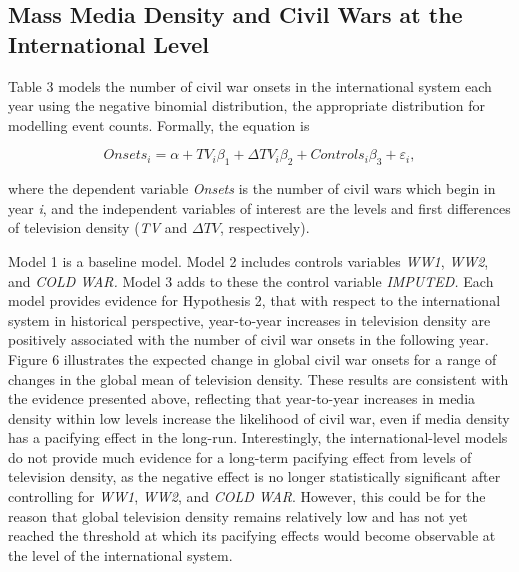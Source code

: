 \documentclass[11pt,article,oneside]{memoir}
\begin{document}
\subsection{Mass Media Density and Civil Wars at the International
Level}\label{mass-media-density-and-civil-wars-at-the-international-level}

Table 3 models the number of civil war onsets in the international
system each year using the negative binomial distribution, the
appropriate distribution for modelling event counts. Formally, the
equation is

\[ Onsets_{i} = \alpha + TV_{i} \beta_1 + \Delta TV_{i} \beta_2 + Controls_{i} \beta_3  + \varepsilon_{i}, \]

where the dependent variable \emph{Onsets} is the number of civil wars
which begin in year \emph{i}, and the independent variables of interest
are the levels and first differences of television density (\emph{TV}
and $\Delta TV$, respectively).

Model 1 is a baseline model. Model 2 includes controls variables
\emph{WW1}, \emph{WW2}, and \emph{COLD WAR.} Model 3 adds to these the
control variable \emph{IMPUTED.} Each model provides evidence for
Hypothesis 2, that with respect to the international system in
historical perspective, year-to-year increases in television density are
positively associated with the number of civil war onsets in the
following year. Figure 6 illustrates the expected change in global civil
war onsets for a range of changes in the global mean of television
density. These results are consistent with the evidence presented above,
reflecting that year-to-year increases in media density within low
levels increase the likelihood of civil war, even if media density has a
pacifying effect in the long-run. Interestingly, the international-level
models do not provide much evidence for a long-term pacifying effect
from levels of television density, as the negative effect is no longer
statistically significant after controlling for \emph{WW1}, \emph{WW2},
and \emph{COLD WAR}. However, this could be for the reason that global
television density remains relatively low and has not yet reached the
threshold at which its pacifying effects would become observable at the
level of the international system.
\end{document}
